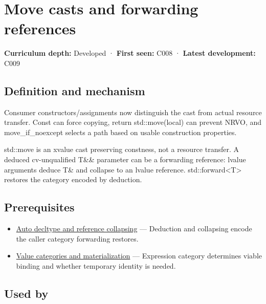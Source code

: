 \hypertarget{appendix-0104b704fb11}{}\label{referencestart:appendix-0104b704fb11}
\section{Move casts and forwarding references}\label{appendix-0104b704fb11-move-casts-and-forwarding-references}

\textbf{Curriculum depth:} Developed · \textbf{First seen:} C008 · \textbf{Latest development:} C009

\begin{allmightroledefinition}

\subsection{Definition and mechanism}\label{appendix-0104b704fb11-definition-and-mechanism}

Consumer constructors/assignments now distinguish the cast from actual resource transfer. Const can force copying, return std::move(local) can prevent NRVO, and move\_if\_noexcept selects a path based on usable construction properties.

\end{allmightroledefinition}

std::move is an xvalue cast preserving constness, not a resource transfer. A deduced cv-unqualified T\&\& parameter can be a forwarding reference: lvalue arguments deduce T\& and collapse to an lvalue reference. std::forward\textless T\textgreater{} restores the category encoded by deduction.

\subsection{Prerequisites}\label{appendix-0104b704fb11-prerequisites}

\begin{itemize}
\tightlist
\item
  \hyperref[appendix-5d4252a42886]{Auto decltype and reference collapsing} --- Deduction and collapsing encode the caller category forwarding restores.
\item
  \hyperref[appendix-1121b30eaeb0]{Value categories and materialization} --- Expression category determines viable binding and whether temporary identity is needed.
\end{itemize}

\subsection{Used by}\label{appendix-0104b704fb11-used-by}

